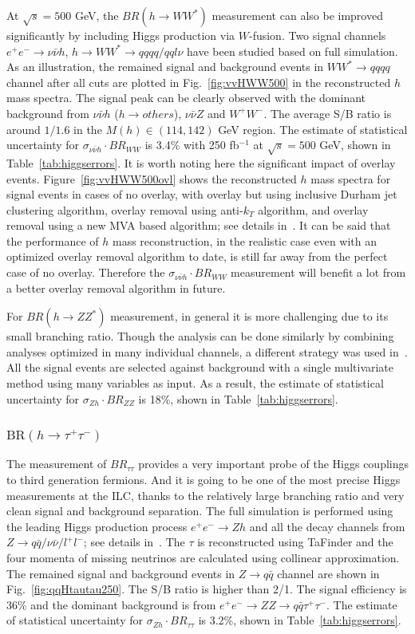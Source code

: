 At $\sqrt{s}=500$ GeV, the $BR(h\to WW^*)$ measurement can also be improved significantly by including 
Higgs production via $W$-fusion. Two signal channels $e^+e^-\to\nu\bar{\nu}h$, $h\to WW^*\to qqqq / qql\nu$
have been studied based on full simulation. As an illustration, 
the remained signal and background events in $WW^*\to qqqq$ channel
after all cuts are plotted in Fig.~\ref{fig:vvHWW500} in the reconstructed $h$ mass spectra. The signal peak
can be clearly observed with the dominant background from $\nu\bar{\nu}h$ ($h\to others$), 
$\nu\bar{\nu}Z$ and $W^+W^-$. The average S/B ratio is around $1/1.6$ in the $M(h)\in(114,142)$ GeV 
region. The estimate of statistical uncertainty for $\sigma_{\nu\bar{\nu}h}\cdot BR_{WW}$ is
3.4\% with 250 fb$^{-1}$ at $\sqrt{s}=500$ GeV, shown in Table~\ref{tab:higgserrors}.
It is worth noting here the significant impact of overlay events. Figure~\ref{fig:vvHWW500ovl} 
shows the reconstructed $h$ mass spectra for signal events in cases of no overlay, with overlay but using
inclusive Durham jet clustering algorithm, overlay removal using anti-$k_T$ algorithm, and overlay
removal using a new MVA based algorithm; see details in~\cite{Durig:2014lfa}. 
It can be said that the performance of $h$ mass reconstruction,
in the realistic case even with an optimized overlay removal algorithm to date, is still far away from the 
perfect case of no overlay. Therefore the $\sigma_{\nu\bar{\nu}h}\cdot BR_{WW}$ measurement will 
benefit a lot from a better overlay removal algorithm in future.

For $BR(h\to ZZ^*)$ measurement, in general it is more challenging due to its small branching ratio.
Though the analysis can be done similarly by combining analyses optimized in many individual channels, 
a different strategy was used in~\cite{Asner:2013psa}.
All the signal events are selected against background with a single multivariate method using many
variables as input. As a result, the estimate of statistical uncertainty for
$\sigma_{Zh}\cdot BR_{ZZ}$ is 18\%, shown in Table~\ref{tab:higgserrors}.


\subsubsection{$\mathrm{BR}(h\to \tau^+\tau^-)$}
The measurement of $BR_{\tau\tau}$ provides a very important probe of the Higgs couplings to
third generation fermions. And it is going to be one of the most precise Higgs measurements at the ILC, 
thanks to the relatively large branching ratio and very clean signal and background separation. 
The full simulation is performed using the leading Higgs production process $e^+e^-\to Zh$ and 
all the decay channels from $Z\to q\bar{q} / \nu\bar{\nu}/ l^+l^-$; see details in~\cite{Kawada:2015wea}.
The $\tau$ is reconstructed using TaFinder and the four momenta of missing neutrinos are 
calculated using collinear approximation. The remained signal and
 background events in $Z\to q\bar{q}$ channel are shown in 
 Fig.~\ref{fig:qqHtautau250}. The S/B ratio is higher than 2/1. The signal efficiency is 36\% and
 the dominant background is from $e^+e^-\to ZZ\to q\bar{q}\tau^+\tau^-$.
 The estimate of statistical uncertainty for $\sigma_{Zh}\cdot BR_{\tau\tau}$ is 
3.2\%, shown in Table~\ref{tab:higgserrors}.

